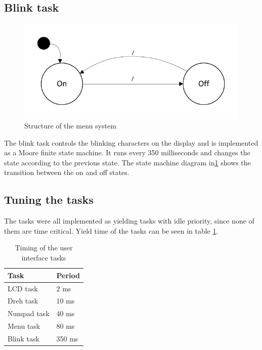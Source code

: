 \subsection{Blink task}
\begin{figure}[htb]
	\centering
	\includegraphics[scale=1,trim=0 0 0 0]{graphics/blink_task_fsm.pdf} 
	\caption{Structure of the menu system}
	\label{fig:blink_task_fsm}
\end{figure}
The blink task controls the blinking characters on the display and is implemented as a Moore finite state machine. It runs every 350 milliseconds and changes the state according to the previous state. The state machine diagram in\ref{fig:blink_task_fsm} shows the transition between the on and off states.

\subsection{Tuning the tasks}
The tasks were all implemented as yielding tasks with idle priority, since none of them are time critical. Yield time of the tasks can be seen in table \ref{tab:ui_task_timing}.

\begin{table}[htb]	
	\centering
	\begin{tabular}{l|l}					
	Task & Period \\					
	\hline							
LCD task & 2 ms \\
Dreh task  & 10 ms \\
Numpad task & 40 ms \\
Menu task & 80 ms \\
Blink task & 350 ms \\
	\end{tabular}
	\caption{Timing of the user interface tasks}	
	\label{tab:ui_task_timing}				
\end{table}

